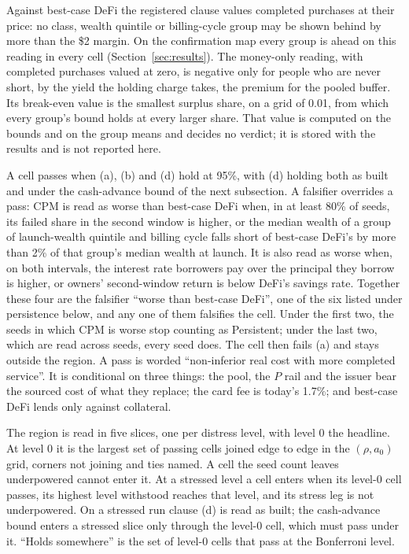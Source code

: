 Against best-case DeFi the registered clause values completed purchases at their price: no class, wealth quintile
or billing-cycle group may be shown behind by more than the \$2 margin. On the confirmation map every group
is ahead on this reading in every cell (Section~\ref{sec:results}). The money-only reading, with completed purchases valued at zero, is negative
only for people who are never short, by the yield the holding charge takes, the premium for the pooled
buffer. Its break-even value is the smallest surplus share, on a grid of 0.01, from which every group's bound holds
at every larger share. That value is computed on the bounds and on the group means and decides no verdict; it is
stored with the results and is not reported here.

A cell passes when (a), (b) and (d) hold at 95\%, with (d) holding both as built and under the cash-advance bound
of the next subsection. A falsifier overrides a pass: CPM is read as worse than best-case DeFi when, in at least
80\% of seeds, its failed share in the second window is higher, or the median wealth of a group of launch-wealth
quintile and billing cycle falls short of best-case DeFi's by more than 2\% of that group's median wealth at
launch. It is also read as worse when, on both intervals, the interest rate borrowers pay over the principal they borrow is higher, or
owners' second-window return is below DeFi's savings rate. Together these four are the falsifier
``worse than best-case DeFi'', one of the six listed under persistence below, and any one of them falsifies the
cell. Under the first two, the seeds in which CPM is worse stop counting as Persistent; under the last two, which
are read across seeds, every seed does. The cell then fails (a) and stays outside the region. A pass is worded
``non-inferior real cost with more completed service''. It is conditional on three things: the pool, the $P$ rail
and the issuer bear the sourced cost of what they replace; the card fee is today's 1.7\%; and best-case DeFi lends
only against collateral.

The region is read in five slices, one per distress level, with level 0 the headline. At level 0 it is the largest
set of passing cells joined edge to edge in the $(\rho, a_{0})$ grid, corners not joining and ties named. A cell
the seed count leaves underpowered cannot enter it. At a stressed level a cell enters when its level-0 cell passes,
its highest level withstood reaches that level, and its stress leg is not underpowered. On a stressed run clause
(d) is read as built; the cash-advance bound enters a stressed slice only through the level-0 cell, which must
pass under it. ``Holds somewhere'' is the
set of level-0 cells that pass at the Bonferroni level.

